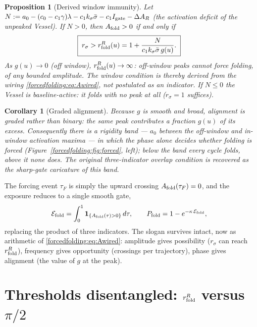 \documentclass[11pt,a4paper,oneside]{book}
\newcommand{\Igate}{I_{\rm gate}}
\newcommand{\Af}{A_{\rm fold}}
\newcommand{\rs}{r_\sigma}
\newcommand{\rR}{r^{R}_{\rm fold}}
\theoremstyle{plain}
\newtheorem{proposition}{Proposition}[chapter]
\newtheorem{corollary}{Corollary}[chapter]
\theoremstyle{definition}
\theoremstyle{remark}
\begin{document}
\begin{proposition}[Derived window immunity]\label{forcedfolding:prop:immunity}
Let $N:=a_0-(c_0-c_1\gamma)\lambda-c_1k_\sigma\bar\sigma-c_1\Igate-\Delta A_R$ (the activation deficit of
the unpeaked Vessel). If $N>0$, then $\Af>0$ if and only if
\begin{equation}
\boxed{\;\rs>\rR(u)=1+\frac{N}{c_1k_\sigma\bar\sigma\,g(u)}.\;}
\end{equation}
As $g(u)\to0$ (off window), $\rR(u)\to\infty$: off-window peaks cannot force folding, of any bounded
amplitude. The window condition is thereby \emph{derived} from the wiring \eqref{forcedfolding:eq:Awired}, not
postulated as an indicator. If $N\le0$ the Vessel is baseline-active: it folds with no peak at all
($\rs=1$ suffices).
\end{proposition}

\begin{corollary}[Graded alignment]\label{forcedfolding:cor:graded}
Because $g$ is smooth and broad, alignment is graded rather than binary: the same peak contributes a
fraction $g(u)$ of its excess. Consequently there is a rigidity band --- $a_0$ between the off-window and
in-window activation maxima --- in which the \emph{phase} alone decides whether folding is forced
(Figure~\ref{forcedfolding:fig:forced}, left); below the band every cycle folds, above it none does. The original
three-indicator overlap condition is recovered as the sharp-gate caricature of this band.
\end{corollary}

The forcing event $\tau_F$ is simply the upward crossing $\Af(\tau_F)=0$, and the exposure reduces to a
single smooth gate,
\begin{equation}
\mathcal E_{\rm fold}=\int_0^1\mathbf 1_{\{\Af(\tau)>0\}}\,d\tau,
\qquad
P_{\rm fold}=1-e^{-\kappa\,\mathcal E_{\rm fold}},
\end{equation}
replacing the product of three indicators. The slogan survives intact, now as arithmetic of
\eqref{forcedfolding:eq:Awired}: amplitude gives possibility ($\rs$ can reach $\rR$), frequency gives opportunity
(crossings per trajectory), phase gives alignment (the value of $g$ at the peak).

\section{Thresholds disentangled: $\rR$ versus $\pi/2$}\label{forcedfolding:sec:thresholds}
\end{document}
